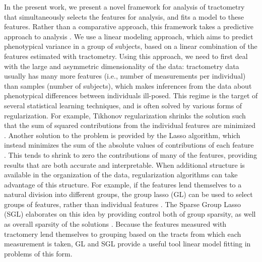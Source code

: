In the present work, we present a novel framework for analysis of tractometry
that simultaneously selects the features for analysis, and fits a model to these
features. Rather than a comparative approach, this framework takes a predictive
approach to analysis \cite{Yarkoni2017-bi}. We use a linear modeling approach,
which aims to predict phenotypical variance in a group of subjects, based on a
linear combination of the features estimated with tractometry. Using this
approach, we need to first deal with the large and asymmetric dimensionality of
the data: tractometry data usually has many more features (i.e., number of
measurements per individual) than samples (number of subjects), which makes
inferences from the data about phenotypical differences between individuals
ill-posed. This regime is the target of several statistical learning techniques,
and is often solved by various forms of regularization. For example, Tikhonov
regularization shrinks the solution such that the sum of squared contributions
from the individual features are minimized \cite{Hoerl2000-ij}. Another solution
to the problem is provided by the Lasso algorithm, which instead minimizes the
sum of the absolute values of contributions of each feature
\cite{Tibshirani1996-qs}. This tends to shrink to zero the contributions of many
of the features, providing results that are both accurate and interpretable.
When additional structure is available in the organization of the data,
regularization algorithms can take advantage of this structure. For example, if
the features lend themselves to a natural division into different groups, the
group lasso (GL) can be used to select groups of features, rather than
individual features \cite{Yuan2006-ky}. The Sparse Group Lasso (SGL) elaborates
on this idea by providing control both of group sparsity, as well as overall
sparsity of the solutions \cite{simon2013sgl}. Because the features measured
with tractomery lend themselves to grouping based on the tracts from which each
measurement is taken, GL and SGL provide a useful tool linear model fitting in
problems of this form.

